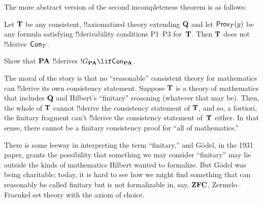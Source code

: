 \documentclass[../../../include/open-logic-section]{subfiles}
\begin{document}
The more abstract version of the second incompleteness theorem is as follows:

\begin{thm}
 Let $\mathbf{T}$ be any
consistent, !!{axiomatized} theory extending $\mathbf{Q}$ and let
$\OProv[T](y)$ be any formula satisfying !!{derivability} conditions
P1--P3 for~$\mathbf{T}$. Then $\mathbf{T}$ does not !!{derive}~$\OCon[T]$.
\end{thm}

\begin{prob}
Show that $\mathbf{PA}$ !!{derive}s $!G_{\Th{PA}} \lif \OCon[\Th{PA}]$.
\end{prob}

\begin{digress}
The moral of the story is that no ``reasonable'' consistent theory for
mathematics can !!{derive} its own consistency statement. Suppose
$\mathbf{T}$ is a theory of mathematics that includes $\mathbf{Q}$ and
Hilbert's ``finitary'' reasoning (whatever that may be). Then, the
whole of $\mathbf{T}$ cannot !!{derive} the consistency statement of
$\mathbf{T}$, and so, a fortiori, the finitary fragment can't !!{derive}
the consistency statement of~$\mathbf{T}$ either. In that sense, there
cannot be a finitary consistency proof for ``all of mathematics.''

There is some leeway in interpreting the term ``finitary,'' and
G\"odel, in the 1931 paper, grants the possibility that something we
may consider ``finitary'' may lie outside the kinds of mathematics
Hilbert wanted to formalize. But G\"odel was being charitable; today,
it is hard to see how we might find something that can reasonably be
called finitary but is not formalizable in, say, $\mathbf{ZFC}$,
Zermelo--Fraenkel set theory with the axiom of choice.
\end{digress}
\end{document}
